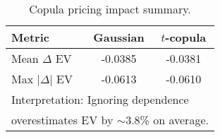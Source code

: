 \begin{table}[t]
  \centering
  \small
  \caption{Copula pricing impact summary.}
  \begin{tabular}{lcc}
    \toprule
    Metric & Gaussian & $t$-copula \\
    \midrule
    Mean $\Delta$ EV & -0.0385 & -0.0381 \\
    Max $|\Delta|$ EV & -0.0613 & -0.0610 \\
    \midrule
    \multicolumn{3}{l}{Interpretation: Ignoring dependence} \\
    \multicolumn{3}{l}{overestimates EV by $\sim$3.8\% on average.} \\
    \bottomrule
  \end{tabular}
  \label{tab:copula_impact_summary}
\end{table}